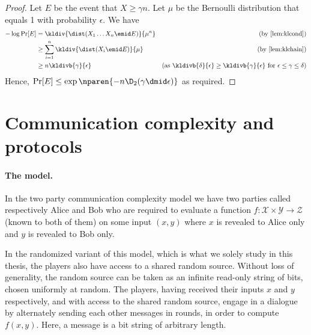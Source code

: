 \begin{proof}
Let $E$ be the event that $X\ge \gamma n$. 
Let $\mu$ be the Bernoulli distribution that 
equals 1 with probability $\epsilon$. We have
\begin{align*}
-\log\Pr[E]
  &= \kldiv{\dist(X_1\ldots X_n\emid E)}{\mu^n} 
  & \text{(by \autoref{lem:klcond})}\\
%
  &\ge \sum_{i=1}^n \kldiv{\dist(X_i\emid E)}{\mu} 
  &\text{(by \autoref{lem:klchain})}\\
%
  &\geq n \kldivb{\gamma}{\epsilon}
  &\text{(as $\kldivb{\delta}{\epsilon}
    \geq\kldivb{\gamma}{\epsilon}$ for $\epsilon\leq \gamma\leq\delta$)}
\end{align*}
Hence,
$\Pr[E]
  \le \exp\nparen{-n\D_2(\gamma\dmid \epsilon)}$ as required.
\end{proof}


\section{Communication complexity and protocols}
\label{sec:prelim:comm}

\paragraph{The model.} In the two party communication complexity model we have two
parties called respectively Alice and Bob who are required to
evaluate a function
$f\colon\mathcal{X}\times\mathcal{Y}\to\mathcal{Z}$ (known to
both of them) on some input $(x,y)$ where $x$ is revealed to
Alice only and $y$ is revealed to Bob only.

In the randomized variant of this model, which is what we solely
study in this thesis, the players also have access to a shared
random source. Without loss of generality, the random source can
be taken as an infinite read-only string of bits, chosen
uniformly at random. The players, having received their inputs
$x$ and $y$ respectively, and with access to the shared random
source, engage in a dialogue by alternately sending each other
messages in rounds, in order to compute $f(x,y)$. Here, a
message is a bit string of arbitrary length.

